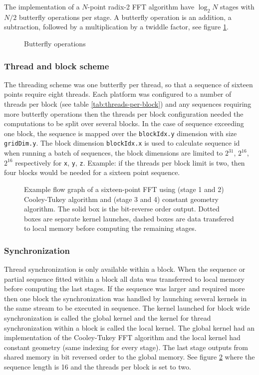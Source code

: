 The implementation of a $N$-point radix-2 FFT algorithm have $\log_2 N$ stages with $N/2$ butterfly operations per stage. A butterfly operation is an addition, a subtraction, followed by a multiplication by a twiddle factor, see figure \ref{fig:butterfly}.
\begin{figure}[H]
	\centering
	
	\caption{Butterfly operations}
	\label{fig:butterfly}
\end{figure}

\subsubsection{Thread and block scheme}

The threading scheme was one butterfly per thread, so that a sequence of sixteen points require eight threads. Each platform was configured to a number of threads per block (see table \ref{tab:threads-per-block}) and any sequences requiring more butterfly operations then the threads per block configuration needed the computations to be split over several blocks. In the case of sequence exceeding one block, the sequence is mapped over the \texttt{blockIdx.y} dimension with size \texttt{gridDim.y}. The block dimension \texttt{blockIdx.x} is used to calculate sequence id when running a batch of sequences, the block dimensions are limited to $2^{31}$, $2^{16}$, $2^{16}$ respectively for \texttt{x}, \texttt{y}, \texttt{z}. Example: if the threads per block limit is two, then four blocks would be needed for a sixteen point sequence.

\begin{figure}[htbp]
	
	\caption{Example flow graph of a sixteen-point FFT using (stage 1 and 2) Cooley-Tukey algorithm and (stage 3 and 4) constant geometry algorithm. The solid box is the bit-reverse order output. Dotted boxes are separate kernel launches, dashed boxes are data transfered to local memory before computing the remaining stages.}
	\label{fig:flowgraph-16}
\end{figure}

\subsubsection{Synchronization}

Thread synchronization is only available within a block. When the sequence or partial sequence fitted within a block all data was transferred to local memory before computing the last stages. If the sequence was larger and required more then one block the synchronization was handled by launching several kernels in the same stream to be executed in sequence. The kernel launched for block wide synchronization is called the global kernel and the kernel for thread synchronization within a block is called the local kernel. The global kernel had an implementation of the Cooley-Tukey FFT algorithm and the local kernel had constant geometry (same indexing for every stage). The last stage outputs from shared memory in bit reversed order to the global memory. See figure \ref{fig:flowgraph-16} where the sequence length is 16 and the threads per block is set to two.

